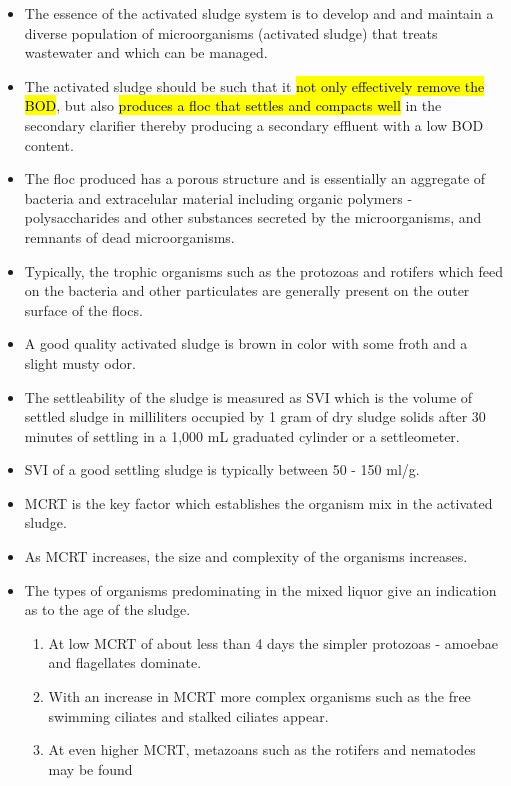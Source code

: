 \begin{itemize}
\item The essence of the activated sludge system is to develop and and maintain a diverse population of microorganisms (activated sludge) that treats wastewater and which can be managed.
\item The activated sludge should be such that it \hl{not only effectively remove the BOD}, but also \hl{produces a floc that settles and compacts well} in the secondary clarifier thereby producing a secondary effluent with a low BOD content.
\item The floc produced has a porous structure and is essentially an aggregate of bacteria and extracelular material including organic polymers - polysaccharides and other substances secreted by the microorganisms, and remnants of dead microorganisms.  
\item Typically, the trophic organisms such as the protozoas and rotifers which feed on the bacteria and other particulates are generally present on the outer surface of the flocs.
\item A good quality activated sludge is brown in color with some froth and a slight musty odor.  
\item The settleability of the sludge is measured as SVI which is the volume of settled sludge in milliliters occupied by 1 gram of dry sludge solids after 30 minutes of settling in a 1,000 mL graduated cylinder or a settleometer.  
\item SVI of a good settling sludge is typically between 50 - 150 ml/g.\\ 
\item MCRT is the key factor which establishes the organism mix in the activated sludge.  
\item As MCRT increases, the size and complexity of the organisms increases.  
\item The types of organisms predominating in the mixed liquor give an indication as to the age of the sludge.
\begin{enumerate}[1.]  
\item At low MCRT of about less than 4 days the simpler protozoas - amoebae and flagellates dominate. 
\item With an increase in MCRT more complex organisms such as the free swimming ciliates and stalked ciliates appear. 
\item At even higher MCRT, metazoans such as the rotifers and nematodes may be found
\end{enumerate}
\end{itemize}

